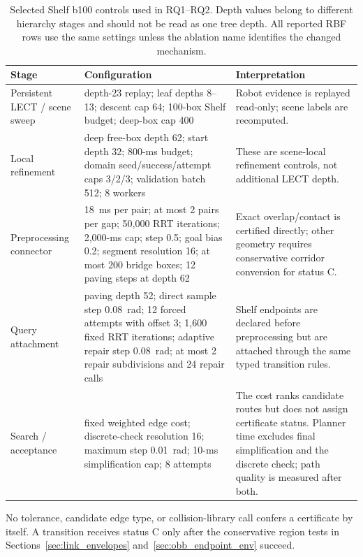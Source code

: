 \documentclass[journal]{IEEEtran}
\newcommand{\StatusC}{\ensuremath{\mathrm{C}}}
\begin{document}
\begin{table}[!t]
\centering
\caption{Selected Shelf b100 controls used in RQ1--RQ2. Depth values belong
to different hierarchy stages and should not be read as one tree depth. All
reported RBF rows use the same settings unless the ablation name identifies the
changed mechanism.}
\label{tab:rbf_fixed_profile}
\scriptsize
\setlength{\tabcolsep}{3.3pt}
\renewcommand{\arraystretch}{1.05}
\begin{tabular}{@{}L{0.16\textwidth}L{0.37\textwidth}L{0.40\textwidth}@{}}
\toprule
Stage & Configuration & Interpretation \\
\midrule
Persistent LECT / scene sweep & depth-23 replay; leaf depths 8--13; descent cap 64; 100-box Shelf budget; deep-box cap 400 & Robot evidence is replayed read-only; scene labels are recomputed. \\
Local refinement & deep free-box depth 62; start depth 32; 800-ms budget; domain seed/success/attempt caps 3/2/3; validation batch 512; 8 workers & These are scene-local refinement controls, not additional LECT depth. \\
Preprocessing connector & 18~ms per pair; at most 2 pairs per gap; 50,000 RRT iterations; 2,000-ms cap; step 0.5; goal bias 0.2; segment resolution 16; at most 200 bridge boxes; 12 paving steps at depth 62 & Exact overlap/contact is certified directly; other geometry requires conservative corridor conversion for status $\StatusC$. \\
Query attachment & paving depth 52; direct sample step 0.08~rad; 12 forced attempts with offset 3; 1,600 fixed RRT iterations; adaptive repair step 0.08~rad; at most 2 repair subdivisions and 24 repair calls & Shelf endpoints are declared before preprocessing but are attached through the same typed transition rules. \\
Search / acceptance & fixed weighted edge cost; discrete-check resolution 16; maximum step 0.01~rad; 10-ms simplification cap; 8 attempts & The cost ranks candidate routes but does not assign certificate status. Planner time excludes final simplification and the discrete check; path quality is measured after both. \\
\bottomrule
\end{tabular}
\end{table}

No tolerance, candidate edge type, or collision-library call confers a
certificate by itself. A transition receives status \StatusC{} only after the
conservative region tests in Sections~\ref{sec:link_envelopes} and~\ref{sec:obb_endpoint_env} succeed.
\end{document}
